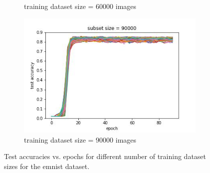 \documentclass{article} %
\begin{document}
\begin{figure}
\begin{subfigure}{.5\textwidth}
        \caption{training dataset size = $60000$ images}
        \label{fig:subsetsize30000}
    \end{subfigure}%
    \begin{subfigure}{.5\textwidth}
        \centering
        \includegraphics[width=.8\linewidth]{emnist/test_acc_vs_epoch_subset_size_90000.jpg}
        \caption{training dataset size = $90000$ images}
        \label{fig:subsetsize45000}
    \end{subfigure}

    \caption{Test accuracies vs. epochs for different number of training dataset sizes for the emnist dataset.}
    \label{fig:emnist_accuracy_vs_epoch_by_subset_size}
\end{figure}
\end{document}
